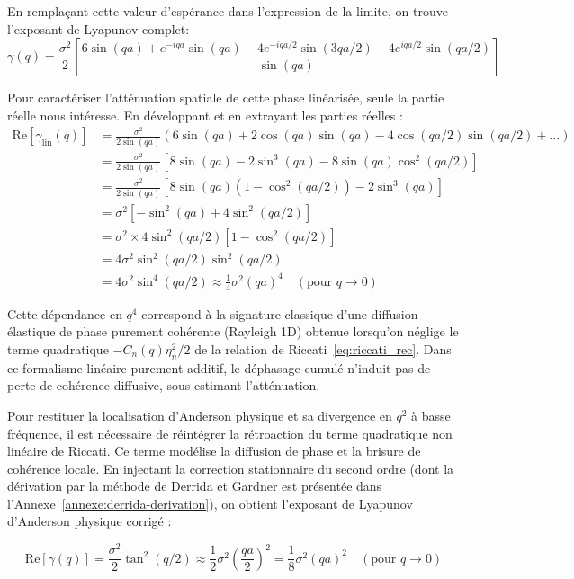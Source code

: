 En remplaçant cette valeur d'espérance dans l'expression de la limite, on trouve l'exposant de Lyapunov complet:
\begin{equation*}
    \gamma(q) = \frac{\sigma^2}{2} \left[ \frac{6 \sin(qa) + e^{-iqa} \sin(qa) - 4e^{-iqa/2} \sin(3qa/2) - 4e^{iqa/2} \sin(qa/2)}{\sin(qa)} \right]
\end{equation*}

Pour caractériser l'atténuation spatiale de cette phase linéarisée, seule la partie réelle nous intéresse. En développant et en extrayant les parties réelles :
\begin{align*}
    \text{Re}[\gamma_{\text{lin}}(q)] &= \frac{\sigma^2}{2 \sin(qa)} (6 \sin(qa) + 2 \cos(qa) \sin(qa) - 4 \cos(qa/2) \sin(qa/2) + \dots) \\
    &= \frac{\sigma^2}{2 \sin(qa)} [8 \sin(qa) - 2 \sin^3(qa) - 8 \sin(qa) \cos^2(qa/2)] \\
    &= \frac{\sigma^2}{2 \sin(qa)} [8 \sin(qa) (1 - \cos^2(qa/2)) - 2 \sin^3(qa)] \\
    &= \sigma^2 [-\sin^2(qa) + 4 \sin^2(qa/2)] \\
    &= \sigma^2 \times 4 \sin^2(qa/2) \left[ 1 - \cos^2(qa/2) \right] \\
    &= 4 \sigma^2 \sin^2(qa/2) \sin^2(qa/2) \\
    &= 4 \sigma^2 \sin^4(qa/2) \approx \frac{1}{4} \sigma^2 (qa)^4 \quad (\text{pour } q \to 0)
\end{align*}

Cette dépendance en $q^4$ correspond à la signature classique d'une diffusion élastique de phase purement cohérente (Rayleigh 1D) obtenue lorsqu'on néglige le terme quadratique $-C_n(q)\eta_n^2/2$ de la relation de Riccati~\eqref{eq:riccati_rec}. Dans ce formalisme linéaire purement additif, le déphasage cumulé n'induit pas de perte de cohérence diffusive, sous-estimant l'atténuation.

Pour restituer la localisation d'Anderson physique et sa divergence en $q^2$ à basse fréquence, il est nécessaire de réintégrer la rétroaction du terme quadratique non linéaire de Riccati. Ce terme modélise la diffusion de phase et la brisure de cohérence locale. En injectant la correction stationnaire du second ordre (dont la dérivation par la méthode de Derrida et Gardner est présentée dans l'Annexe~\ref{annexe:derrida-derivation}), on obtient l'exposant de Lyapunov d'Anderson physique corrigé :

\begin{equation}\label{eq:lyapunov_corrected_riccati}
    \text{Re}[\gamma(q)] = \frac{\sigma^2}{2} \tan^2(q/2) \approx \frac{1}{2} \sigma^2 \left(\frac{qa}{2}\right)^2 = \frac{1}{8} \sigma^2 (qa)^2 \quad (\text{pour } q \to 0)
\end{equation}

